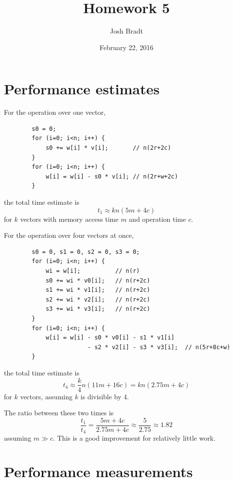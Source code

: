 \documentclass{article}
\title{Homework 5}
\author{Josh Bradt}
\date{February 22, 2016}
\begin{document}
\maketitle

\section{Performance estimates}

    For the operation over one vector,
    \begin{verbatim}
        s0 = 0;
        for (i=0; i<n; i++) {
            s0 += w[i] * v[i];       // n(2r+2c)
        }
        for (i=0; i<n; i++) {
            w[i] = w[i] - s0 * v[i]; // n(2r+w+2c)
        }
    \end{verbatim}
    the total time estimate is
    \begin{equation}
        t_1 \approx kn(5m+4c)
    \end{equation}
    for $k$ vectors with memory access time $m$ and operation time $c$.

    For the operation over four vectors at once,
    \begin{verbatim}
        s0 = 0, s1 = 0, s2 = 0, s3 = 0;
        for (i=0; i<n; i++) {
            wi = w[i];          // n(r)
            s0 += wi * v0[i];   // n(r+2c)
            s1 += wi * v1[i];   // n(r+2c)
            s2 += wi * v2[i];   // n(r+2c)
            s3 += wi * v3[i];   // n(r+2c)
        }
        for (i=0; i<n; i++) {
            w[i] = w[i] - s0 * v0[i] - s1 * v1[i]
                        - s2 * v2[i] - s3 * v3[i];  // n(5r+8c+w)
        }
    \end{verbatim}
    the total time estimate is
    \begin{equation}
        t_4 \approx \frac{k}{4}n(11m+16c) = kn(2.75m+4c)
    \end{equation}
    for $k$ vectors, assuming $k$ is divisible by 4.

    The ratio between these two times is
    \begin{equation}
        \frac{t_1}{t_4} = \frac{5m+4c}{2.75m+4c} \approx \frac{5}{2.75} \approx 1.82
    \end{equation}
    assuming $m \gg c$. This is a good improvement for relatively little work.

\section{Performance measurements}
\end{document}
